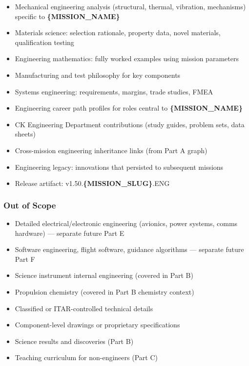 \documentclass[11pt,letterpaper]{article}
\newcommand{\param}[1]{\textcolor{paramred}{\textbf{\{#1\}}}}
\begin{document}
\begin{itemize}[leftmargin=*]
  \item Mechanical engineering analysis (structural, thermal, vibration, mechanisms) specific to \param{MISSION\_NAME}
  \item Materials science: selection rationale, property data, novel materials, qualification testing
  \item Engineering mathematics: fully worked examples using mission parameters
  \item Manufacturing and test philosophy for key components
  \item Systems engineering: requirements, margins, trade studies, FMEA
  \item Engineering career path profiles for roles central to \param{MISSION\_NAME}
  \item CK Engineering Department contributions (study guides, problem sets, data sheets)
  \item Cross-mission engineering inheritance links (from Part A graph)
  \item Engineering legacy: innovations that persisted to subsequent missions
  \item Release artifact: v1.50.\param{MISSION\_SLUG}.ENG
\end{itemize}

\subsubsection{Out of Scope}

\begin{itemize}[leftmargin=*]
  \item Detailed electrical/electronic engineering (avionics, power systems, comms hardware) --- separate future Part E
  \item Software engineering, flight software, guidance algorithms --- separate future Part F
  \item Science instrument internal engineering (covered in Part B)
  \item Propulsion chemistry (covered in Part B chemistry context)
  \item Classified or ITAR-controlled technical details
  \item Component-level drawings or proprietary specifications
  \item Science results and discoveries (Part B)
  \item Teaching curriculum for non-engineers (Part C)
\end{itemize}
\end{document}
